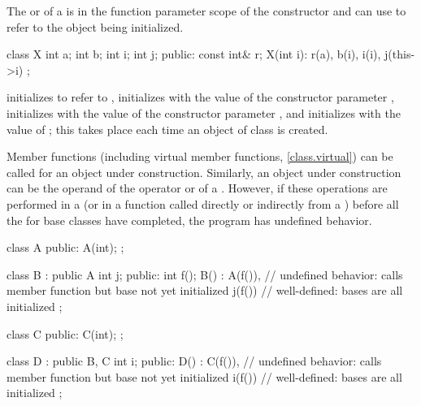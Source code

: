 \pnum
{}%
\begin{note}
The  or 
of a 
is in the function parameter scope of the constructor
and can use  to refer to the object being initialized.
\end{note}
\begin{example}
\begin{codeblock}
class X {
  int a;
  int b;
  int i;
  int j;
public:
  const int& r;
  X(int i): r(a), b(i), i(i), j(this->i) { }
};
\end{codeblock}

initializes
to refer to
,
initializes
with the value of the constructor parameter
,
initializes
with the value of the constructor parameter
,
and initializes
with the value of
;
this takes place each time an object of class
is created.
\end{example}

\pnum
{}%
Member functions (including virtual member functions, \ref{class.virtual}) can be
called for an object under construction.
Similarly, an object under construction can be the operand of the
operator or of a
.
However, if these operations are performed in a
(or in a function called directly or indirectly from a
)
before all the
for base classes have completed, the program has undefined behavior.
\begin{example}
\begin{codeblock}
class A {
public:
  A(int);
};

class B : public A {
  int j;
public:
  int f();
  B() : A(f()),     // undefined behavior: calls member function but base  not yet initialized
  j(f()) { }        // well-defined: bases are all initialized
};

class C {
public:
  C(int);
};

class D : public B, C {
  int i;
public:
  D() : C(f()),     // undefined behavior: calls member function but base  not yet initialized
  i(f()) { }        // well-defined: bases are all initialized
};
\end{codeblock}
\end{example}

